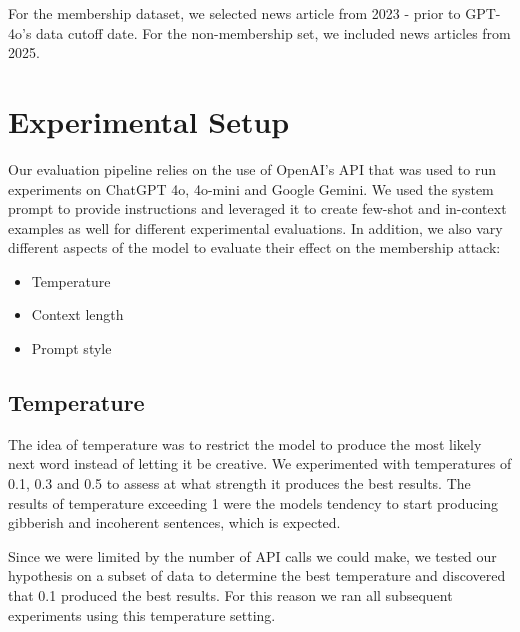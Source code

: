 \documentclass[sigconf]{acmart}
\begin{document}
For the membership dataset, we selected news article from 2023 - prior to GPT-4o's data cutoff date. For the non-membership set, we included news articles from 2025.


\section{Experimental Setup}

Our evaluation pipeline relies on the use of OpenAI's API that was used to run experiments on ChatGPT 4o, 4o-mini and Google Gemini. We used the system prompt to provide instructions and leveraged it to create few-shot and in-context examples as well for different experimental evaluations. In addition, we also vary different aspects of the model to evaluate their effect on the membership attack:

\begin{itemize}
    \item Temperature
    \item Context length
    \item Prompt style
    
\end{itemize}

\subsection{Temperature}

The idea of temperature was to restrict the model to produce the most likely next word instead of letting it be creative. We experimented with temperatures of 0.1, 0.3 and 0.5 to assess at what strength it produces the best results. The results of temperature exceeding 1 were the models tendency to start producing gibberish and incoherent sentences, which is expected. 

Since we were limited by the number of API calls we could make, we tested our hypothesis on a subset of data to determine the best temperature and discovered that 0.1 produced the best results. For this reason we ran all subsequent experiments using this temperature setting. 


\end{document}
